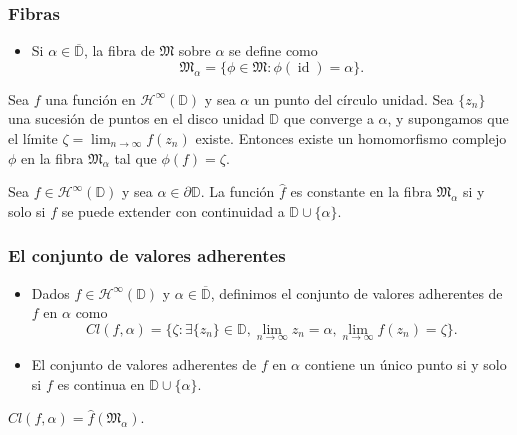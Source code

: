 \documentclass[spanish, a4paper, 12pt, final, slideColor, nototal, colorBG, pdf, noaccumulate, darkblue]{beamer}
\providecommand{\bholomorphic}[1]{\mathcal{H}^{\infty}(#1)}
\newcommand{\disk}{\mathbb{D}}
\newcommand{\closedisk}{\overline{\disk}}
\newcommand{\id}{\operatorname{id}}
\newcommand{\fiber}{\mathfrak{M}}
\begin{document}
\begin{frame}
    \frametitle{Fibras}
    \begin{itemize}
        \item Si $\alpha \in \closedisk$, la fibra de $\fiber$ sobre $\alpha$ se define como
        \begin{equation*}
            \fiber_\alpha = \{\phi \in \fiber : \phi (\id) = \alpha\}.
        \end{equation*}
    \end{itemize}

    \begin{block}{}
        Sea $f$ una función en $\bholomorphic{\disk}$ y sea $\alpha$ un punto del círculo unidad. Sea $\{z_n\}$ una sucesión de puntos en el disco unidad $\disk$ que converge a $\alpha$, y supongamos que el límite $\zeta = \lim_{n \to \infty} f(z_n)$ existe. Entonces existe un homomorfismo complejo $\phi$ en la fibra $\fiber_\alpha$ tal que $\phi(f) = \zeta$.
    \end{block}

    \begin{block}{}
        Sea $f \in \bholomorphic{\disk}$ y sea $\alpha \in \partial \disk$. La función $\widehat f$ es constante en la fibra $\fiber_\alpha$ si y solo si $f$ se puede extender con continuidad a $\disk \cup \{\alpha\}.$
    \end{block}
\end{frame}

\begin{frame}
    \frametitle{El conjunto de valores adherentes}
    \begin{itemize}
        \item  Dados $f \in \bholomorphic{\disk}$ y $\alpha \in \closedisk$, definimos el conjunto de valores adherentes de $f$ en $\alpha$ como
            \begin{equation*}
                Cl(f, \alpha) = \{\zeta : \exists \{z_n\} \in \disk, \lim_{n \to \infty} z_n = \alpha, \lim_{n \to \infty} f(z_n) = \zeta \}.
            \end{equation*}

        \item El conjunto de valores adherentes de $f$ en $\alpha$ contiene un único punto si y solo si $f$ es continua en $\disk \cup \{\alpha\}$.
    \end{itemize}

    \begin{block}{} \centering
         $Cl(f, \alpha) = \widehat{f}(\fiber_\alpha)$.
    \end{block}
\end{frame}
\end{document}
